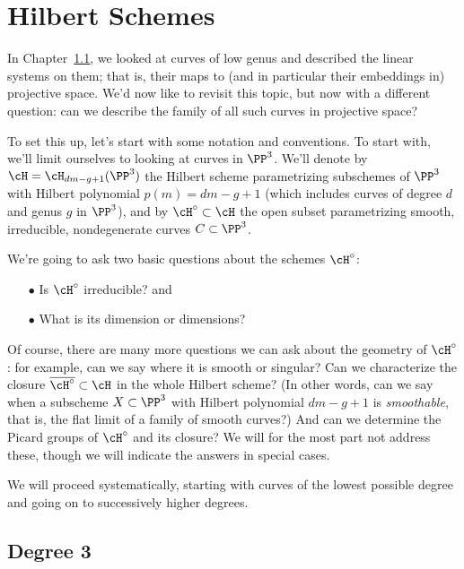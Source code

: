 

\chapter{Hilbert Schemes}
\label{HilbertSchemesChapter}

In Chapter~\ref{}, we looked at curves of low genus and described the linear systems on them; that is, their maps to (and in particular their embeddings in) projective space. We'd now like to revisit this topic, but now with a different question: can we describe the family of all such curves in projective space?

To set this up, let's start with some notation and conventions. To start with, we'll limit ourselves to looking at curves in $\PP^3$. We'll denote by $\cH = \cH_{dm-g+1}(\PP^3)$ the Hilbert scheme parametrizing subschemes of $\PP^3$ with Hilbert polynomial $p(m) = dm-g+1$ (which includes
curves of degree $d$ and genus $g$ in $\PP^3$), and by $\cH^\circ \subset \cH$ the open subset parametrizing smooth, irreducible, nondegenerate curves $C \subset \PP^3$. 

We're going to ask two basic questions about the schemes $\cH^\circ$:

\begin{enumerate}
\item[$\bullet$] Is $\cH^\circ$ irreducible? and
\item[$\bullet$]  What is its dimension or dimensions?
\end{enumerate}

Of course, there are many more questions we can ask about the geometry of $\cH^\circ$: for example, can we say where it is smooth or singular? Can we characterize the closure $\overline{\cH^\circ} \subset \cH$ in the whole Hilbert scheme? (In other words, can we say when a subscheme $X \subset \PP^3$ with Hilbert polynomial $dm-g+1$ is \emph{smoothable}, that is, the flat limit of a family of smooth curves?) And can we determine the Picard groups of $\cH^\circ$ and its closure? We will for the most part not address these, though we will indicate the answers in special cases.

We will proceed systematically, starting with curves of the lowest possible degree and going on to successively higher degrees.

\section{Degree 3}

